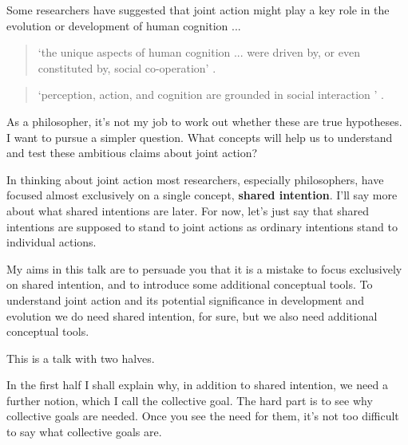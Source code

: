 \documentclass[14pt,a4paper]{extarticle}
\begin{document}
Some researchers have suggested that joint action might play a key role in the evolution or development of human cognition ...
%
\begin{quote} 
`the unique aspects of human cognition ... were driven by, or even constituted by, social co-operation'
\citep[p.\ 1]{Moll:2007gu}.
\end{quote}
%
\begin{quote} 
`perception, action, and cognition are grounded in social interaction%
' \citep[p.\ 103]{Knoblich:2006bn}.
\end{quote}
%
As a philosopher, it's not my job to work out whether these are true hypotheses.  I want to pursue a simpler question.  
What concepts will help us to understand and test these ambitious claims about joint action?

In thinking about joint action most researchers, especially philosophers, have focused almost exclusively on a single concept, \textbf{shared intention}.  
I'll say more about what shared intentions are later.  For now, let's just say that shared intentions are supposed to stand to joint actions as ordinary intentions stand to individual actions.

My aims in this talk are to persuade you that it is a mistake to focus exclusively on shared intention, and to introduce some  additional conceptual tools.  
To understand joint action and its potential significance in development and evolution we do need shared intention, for sure, but we also need additional conceptual tools.



This is a talk with two halves.  

In the first half I shall explain why, in addition to shared intention, we need a further notion, which I call the collective goal.  The hard part is to see why collective goals are needed.  Once you see the need for them, it's not too difficult to say what collective goals are.
\end{document}
